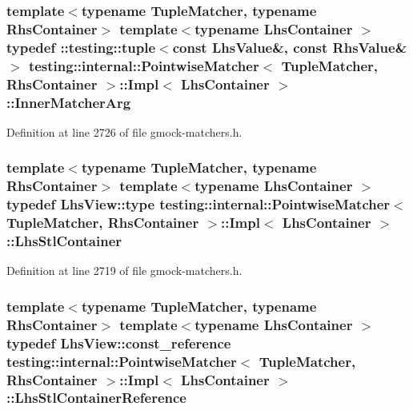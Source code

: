 \subsubsection[{\texorpdfstring{Inner\+Matcher\+Arg}{InnerMatcherArg}}]{\setlength{\rightskip}{0pt plus 5cm}template$<$typename Tuple\+Matcher, typename Rhs\+Container$>$ template$<$typename Lhs\+Container $>$ typedef \+::testing\+::tuple$<$const {\bf Lhs\+Value}\&, const {\bf Rhs\+Value}\&$>$ {\bf testing\+::internal\+::\+Pointwise\+Matcher}$<$ Tuple\+Matcher, Rhs\+Container $>$\+::{\bf Impl}$<$ Lhs\+Container $>$\+::{\bf Inner\+Matcher\+Arg}}\hypertarget{classtesting_1_1internal_1_1_pointwise_matcher_1_1_impl_aba9d983881cbfbb37724b8b40e863898}{}\label{classtesting_1_1internal_1_1_pointwise_matcher_1_1_impl_aba9d983881cbfbb37724b8b40e863898}


Definition at line 2726 of file gmock-\/matchers.\+h.

\subsubsection[{\texorpdfstring{Lhs\+Stl\+Container}{LhsStlContainer}}]{\setlength{\rightskip}{0pt plus 5cm}template$<$typename Tuple\+Matcher, typename Rhs\+Container$>$ template$<$typename Lhs\+Container $>$ typedef {\bf Lhs\+View\+::type} {\bf testing\+::internal\+::\+Pointwise\+Matcher}$<$ Tuple\+Matcher, Rhs\+Container $>$\+::{\bf Impl}$<$ Lhs\+Container $>$\+::{\bf Lhs\+Stl\+Container}}\hypertarget{classtesting_1_1internal_1_1_pointwise_matcher_1_1_impl_a23420b57b4cd6d83cec8afda746c27f2}{}\label{classtesting_1_1internal_1_1_pointwise_matcher_1_1_impl_a23420b57b4cd6d83cec8afda746c27f2}


Definition at line 2719 of file gmock-\/matchers.\+h.

\subsubsection[{\texorpdfstring{Lhs\+Stl\+Container\+Reference}{LhsStlContainerReference}}]{\setlength{\rightskip}{0pt plus 5cm}template$<$typename Tuple\+Matcher, typename Rhs\+Container$>$ template$<$typename Lhs\+Container $>$ typedef {\bf Lhs\+View\+::const\+\_\+reference} {\bf testing\+::internal\+::\+Pointwise\+Matcher}$<$ Tuple\+Matcher, Rhs\+Container $>$\+::{\bf Impl}$<$ Lhs\+Container $>$\+::{\bf Lhs\+Stl\+Container\+Reference}}\hypertarget{classtesting_1_1internal_1_1_pointwise_matcher_1_1_impl_a9df3eb0866f76d59dbdd35fafeb5590c}{}\label{classtesting_1_1internal_1_1_pointwise_matcher_1_1_impl_a9df3eb0866f76d59dbdd35fafeb5590c}


